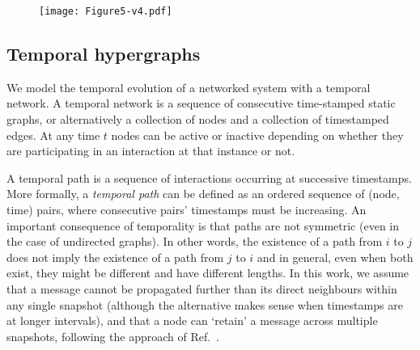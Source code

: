 \documentclass[a4paper,pre,reqno,superscriptaddress, twocolumn, floatfix]{revtex4}
\def\ho{higher-order }
\begin{document}


\begin{figure*}[ht]
    \centering
    \begin{subfigure}{\linewidth}
        \texttt{[image: Figure5-v4.pdf]}
    \end{subfigure}%
    \caption{ \justifying
        Fastest paths in the temporal hypergraph of the Copenhagen study.
    Path-duration distributions of \ho and purely dyadic paths for hypergraphs of the Copenhagen  dataset for (a) the empirical data and (b) a randomised null-model. 
    (c) Average interaction size $\langle{s}\rangle$ of the \ho path as a function of the path duration for empirical (blue) and randomised (dark red) data.
    (d) Average fraction of each path which is purely dyadic as a function of the path duration for empirical (grey) and randomised (light red) data.  
    Shaded areas represent a 97.5\% confidence interval obtained over 100 randomisations.
    }
    \label{fig:5}
\end{figure*}

\subsection*{Temporal hypergraphs}\label{sec:temp}


We model the temporal evolution of a networked system with a temporal network. A temporal network is a sequence of consecutive time-stamped static graphs, or alternatively a collection of nodes and a collection of timestamped edges. 
At any time $t$ nodes can be active or inactive depending on whether they are participating in an interaction at that instance or not. 


A temporal path is a sequence of interactions occurring at successive timestamps. More formally, a \textit{temporal path} can be defined as an ordered sequence of (node, time) pairs, where consecutive pairs' timestamps must be increasing.  
An important consequence of temporality is that 
paths are not symmetric (even in the case of undirected graphs). In other words, the existence of a path from  $i$ to $j$ does not imply the existence of a path from $j$ to $i$ and in general, even when both exist, they might be different and have different lengths. 
In this work, we assume that a message cannot be propagated further than its direct neighbours within any single snapshot (although the alternative makes sense when timestamps are at longer intervals), 
 and that a node can `retain' a message across multiple snapshots, following the approach of Ref.~\cite{nicosia2013graphmetrics}.
\end{document}
